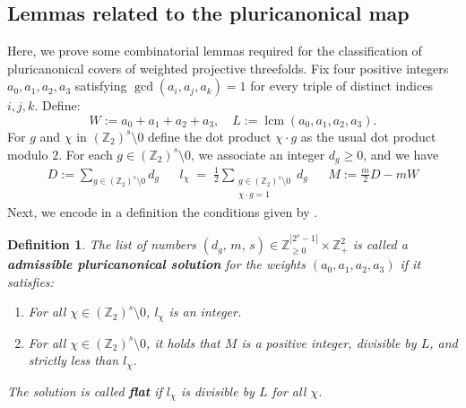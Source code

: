 \documentclass[12pt,twoside,]{amsart}
\theoremstyle{plain}
\newtheorem{definition}[theorem]{Definition}
\theoremstyle{definition}
\begin{document}
\subsection{Lemmas related to the pluricanonical map}
Here, we prove some combinatorial lemmas required for the classification of pluricanonical covers of weighted projective threefolds.  Fix four positive integers $a_0,a_1,a_2,a_3$ satisfying
$\gcd(a_i, a_j, a_k) = 1$ for every triple of distinct indices $i,j,k$. Define:
\[
W := a_0 + a_1 + a_2 + a_3,
\quad
L := \operatorname{lcm}(a_0,a_1,a_2,a_3).
\]
For $g$ and $\chi$ in $(\mathbb{Z}_2)^s \setminus 0$ define the dot product $\chi \cdot g$ as the usual dot product modulo $2$. For each $g \in 
(\mathbb{Z}_2)^s \setminus 0$, we associate an integer $d_g \ge 0$, and we have
\begin{align*}
D := \sum_{g \in (\mathbb{Z}_2)^s \setminus 0} d_g
&&
l_\chi \;=\; 
\frac{1}{2}\sum_{\substack{g \in (\mathbb{Z}_2)^s \setminus 0 \\ \chi \cdot g = 1}} d_{g}
&&
M:= \frac{m}{2}D- mW
\end{align*}
Next, we encode in a definition the conditions given by .



\begin{definition}
The list of numbers
$(d_g,\, m,\, s) \in \mathbb{Z}^{|2^s-1|}_{\geq 0}\times \mathbb{Z}_{+}^2$ is called a \textbf{admissible pluricanonical solution} for the weights $(a_0,a_1,a_2,a_3)$ if it satisfies:
\begin{enumerate}
\item For all $\chi \in (\mathbb{Z}_2)^s \setminus 0$, $l_{\chi}$ is an integer.
\item For all $\chi \in  (\mathbb{Z}_2)^s \setminus 0$, it holds that
$M$ is a positive integer, divisible by $L$, and strictly less than $l_{\chi}$.
\end{enumerate}
The solution is called \textbf{flat} if $l_\chi$ is divisible by $L$ for 
 all $\chi$. 
\end{definition}
\end{document}
